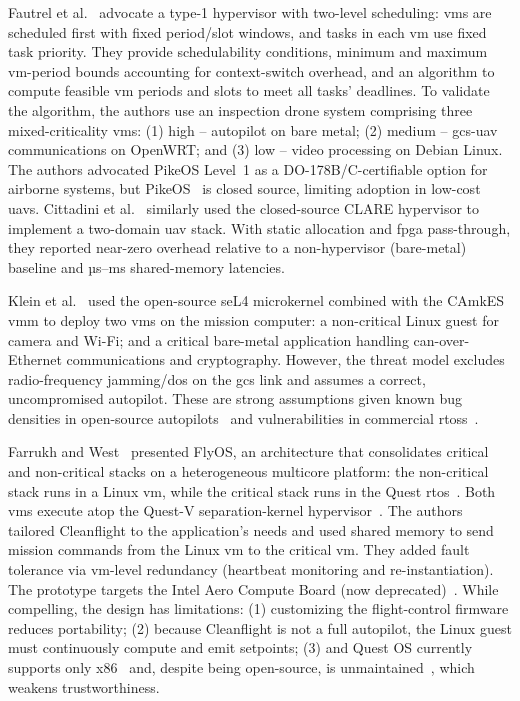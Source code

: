 Fautrel et al.~\cite{fautrel_hypervisor_2019} advocate a type-1 hypervisor with
two-level scheduling: \glspl{vm} are scheduled first with fixed period/slot
windows, and tasks in each \gls{vm} use fixed task priority. They provide
schedulability conditions, minimum and maximum \gls{vm}-period bounds accounting
for context-switch overhead, and an algorithm to compute feasible \gls{vm}
periods and slots to meet all tasks' deadlines.
To validate the algorithm, the authors use an inspection drone system comprising
three mixed-criticality \glspl{vm}: (1) high -- autopilot on bare metal; (2)
medium -- \gls{gcs}-\gls{uav} communications on OpenWRT; and (3) low -- video processing on
Debian Linux.
The authors advocated PikeOS Level~1 as a DO-178B/C-certifiable option for airborne systems,
but PikeOS~\cite{pikeOS} is closed source, limiting adoption in low-cost \glspl{uav}.
Cittadini et al.~\cite{cittadini_supporting_2023} similarly used the closed-source
CLARE hypervisor to implement a two-domain \gls{uav} stack. With static allocation and \gls{fpga} pass-through, they reported near-zero overhead
relative to a non-hypervisor (bare-metal) baseline and µs–ms shared-memory latencies.

Klein et al.~\cite{klein_formally_2018} used the open-source seL4 microkernel combined with
the CAmkES \gls{vmm} to deploy two \glspl{vm} on the mission computer: a
non-critical Linux guest for camera and Wi-Fi; and a critical bare-metal
application handling \gls{can}-over-Ethernet communications and cryptography.
However, the threat model excludes radio-frequency jamming/\gls{dos} on the \gls{gcs}
link and assumes a correct, uncompromised autopilot. These are strong
assumptions given known bug densities in open-source
autopilots~\cite{wang_exploratory_2021} and vulnerabilities in commercial \glspl{rtos}~\cite{buquerin2018security}.

Farrukh and West~\cite{farrukh_flyos_2023} presented FlyOS, an architecture
that consolidates critical and non-critical stacks on a heterogeneous multicore
platform: the non-critical stack runs in a Linux \gls{vm}, while the critical
stack runs in the Quest \gls{rtos}~\cite{danish_virtual-cpu_2011,questOS-home,questOS-repo}.
Both \glspl{vm} execute atop the Quest-V separation-kernel
hypervisor~\cite{li_quest-v_2013}. The authors tailored Cleanflight to the
application's needs and used shared memory to send mission commands from the
Linux \gls{vm} to the critical \gls{vm}. They added fault tolerance via
\gls{vm}-level redundancy (heartbeat monitoring and re-instantiation).
The prototype targets the Intel Aero Compute Board (now deprecated)~\cite{intel-aero}.
While compelling, the design has limitations: (1) customizing the flight-control
firmware reduces portability; (2) because Cleanflight is not a full autopilot, the Linux guest must continuously compute and emit
setpoints; (3) and Quest OS currently supports only x86~\cite{questOS-home}
and, despite being open-source, is unmaintained~\cite{questOS-repo}, which
weakens trustworthiness.

